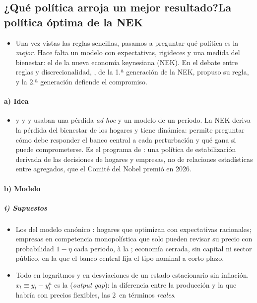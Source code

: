 \documentclass[11pt]{article}
\begin{document}
\subsection{¿Qué política arroja un mejor resultado?\cortetitulo La política óptima de la NEK}\label{sec:nek}

\begin{itemize}
\item Una vez vistas las reglas sencillas, pasamos a preguntar qué política es la \emph{mejor}. Hace falta un modelo con expectativas, rigideces y una medida del bienestar: el de la nueva economía keynesiana (NEK). En el debate entre reglas y discrecionalidad, , de la 1.ª generación de la NEK, propuso su regla, y la 2.ª generación defiende el compromiso.
\end{itemize}

\paragraph{a) Idea}

\begin{itemize}
\item {} y  y  y  usaban una pérdida \emph{ad hoc} y un modelo de un periodo. La NEK deriva la pérdida del bienestar de los hogares y tiene dinámica: permite preguntar cómo debe responder el banco central a cada perturbación y qué gana si puede comprometerse. Es el programa de \textcite{Woodford2003Interest}: una política de estabilización derivada de las decisiones de hogares y empresas, no de relaciones estadísticas entre agregados, que el Comité del Nobel premió en 2026.
\end{itemize}

\paragraph{b) Modelo}

\subparagraph{i) Supuestos}

\begin{itemize}
\item Los del modelo canónico\nocite{ClaridaGaliGertler1999Science,Woodford2003Interest,Gali2015Monetary} : hogares que optimizan con expectativas racionales; empresas en competencia monopolística que solo pueden revisar su precio con probabilidad $1-\eta$ cada periodo, à la \textcite{Calvo1983Staggered}; economía cerrada, sin capital ni sector público, en la que el banco central fija el tipo nominal a corto plazo.
\item Todo en logaritmos y en desviaciones de un estado estacionario sin inflación. $x_t\equiv y_t-y^n_t$ es la  (\emph{output gap}): la diferencia entre la producción y la que habría con precios flexibles, las 2~en términos \emph{reales}.
\end{itemize}
\end{document}
